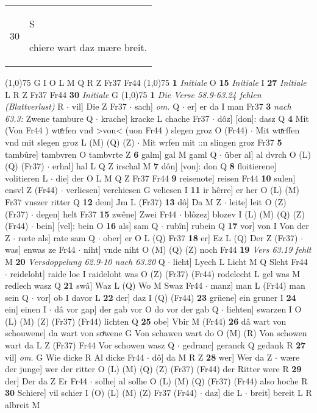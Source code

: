\documentclass[8pt,a4paper,notitlepage]{article}
\begin{document}
\begin{table}[ht]
\begin{minipage}[t]{0.5\linewidth}
\begin{tabular}{rl}
30 & \begin{large}S\end{large}chiere wart daz mære breit.\\ 
\end{tabular}
\scriptsize
\line(1,0){75} \newline
G I O L M Q R Z Fr37 Fr44 \newline
\line(1,0){75} \newline
\textbf{1} \textit{Initiale} O  \textbf{15} \textit{Initiale} I  \textbf{27} \textit{Initiale} L R Z Fr37 Fr44  \textbf{30} \textit{Initiale} G  \newline
\line(1,0){75} \newline
\textbf{1} \textit{Die Verse 58.9-63.24 fehlen (Blattverlust)} R   $\cdot$ vil] Die Z Fr37  $\cdot$ sach] \textit{om.} Q  $\cdot$ er] er da I man Fr37 \textbf{3} \textit{nach 63.3:} Zwene tambure Q   $\cdot$ krache] kracke L chache Fr37  $\cdot$ dôz] [don]: dasz Q \textbf{4} Mit (Von Fr44 ) wuͦrfen vnd >von< (uon Fr44 ) slegen groz O (Fr44)  $\cdot$ Mit wuͯrffen vnd mit slegen groz L (M) (Q) (Z)  $\cdot$ Mit wrfen mit ::n slingen groz Fr37 \textbf{5} tambûre] tambvren O tambvrte Z \textbf{6} galm] gal M gaml Q  $\cdot$ über al] al dvrch O (L) (Q) (Fr37)  $\cdot$ erhal] hal L Q Z irschal M \textbf{7} dôn] [von]: don Q \textbf{8} floitierene] volitieren L  $\cdot$ die] der O L M Q Z Fr37 Fr44 \textbf{9} reisenote] reisen Fr44 \textbf{10} sulen] ensvl Z (Fr44)  $\cdot$ verliesen] verchiesen G veliesen I \textbf{11} ir hêrre] er her O (L) (M) Fr37 vnszer ritter Q \textbf{12} dem] Jm L (Fr37) \textbf{13} dô] Da M Z  $\cdot$ leite] leit O (Z) (Fr37)  $\cdot$ degen] helt Fr37 \textbf{15} zwêne] Zwei Fr44  $\cdot$ blôzez] blozev I (L) (M) (Q) (Z) (Fr44)  $\cdot$ bein] [vel]: bein O \textbf{16} als] sam Q  $\cdot$ rubîn] rubein Q \textbf{17} vor] von I Von der Z  $\cdot$ rœte als] rate sam Q  $\cdot$ ober] er O L (Q) Fr37 \textbf{18} er] Ez L (Q) Der Z (Fr37)  $\cdot$ was] enwas ze Fr44  $\cdot$ niht] vnde niht O (M) (Q) (Z) noch Fr44 \textbf{19} \textit{Vers 63.19 fehlt} M  \textbf{20} \textit{Versdoppelung 62.9-10 nach 63.20} Q   $\cdot$ lieht] Lyech L Licht M Q Sleht Fr44  $\cdot$ reideloht] raide loc I raideloht was O (Z) (Fr37) (Fr44) rodelecht L gel was M redlech wasz Q \textbf{21} swâ] Waz L (Q) Wo M Swaz Fr44  $\cdot$ manz] man L (Fr44) man sein Q  $\cdot$ vor] ob I davor L \textbf{22} der] daz I (Q) (Fr44) \textbf{23} grüene] ein gruner I \textbf{24} ein] einen I  $\cdot$ dâ vor gap] der gab vor O do vor der gab Q  $\cdot$ liehten] swarzen I O (L) (M) (Z) (Fr37) (Fr44) lichten Q \textbf{25} obe] Vbir M (Fr44) \textbf{26} dâ wart von schouwene] da wart von soͮwene G Von schawen wart do O (M) (R) Von schowen wart da L Z (Fr37) Fr44 Vor schowen wasz Q  $\cdot$ gedranc] geranck Q gedank R \textbf{27} vil] \textit{om.} G Wie dicke R Al dicke Fr44  $\cdot$ dô] da M R Z \textbf{28} wer] Wer da Z  $\cdot$ wære der junge] wer der ritter O (L) (M) (Q) (Z) (Fr37) (Fr44) der Ritter were R \textbf{29} der] Der da Z Er Fr44  $\cdot$ solhe] al solhe O (L) (M) (Q) (Fr37) (Fr44) also hoche R \textbf{30} Schiere] vil schier I (O) (L) (M) (Z) Fr37 (Fr44)  $\cdot$ daz] die L  $\cdot$ breit] bereit L R albreit M \newline

\end{minipage}
\end{table}
\end{document}
